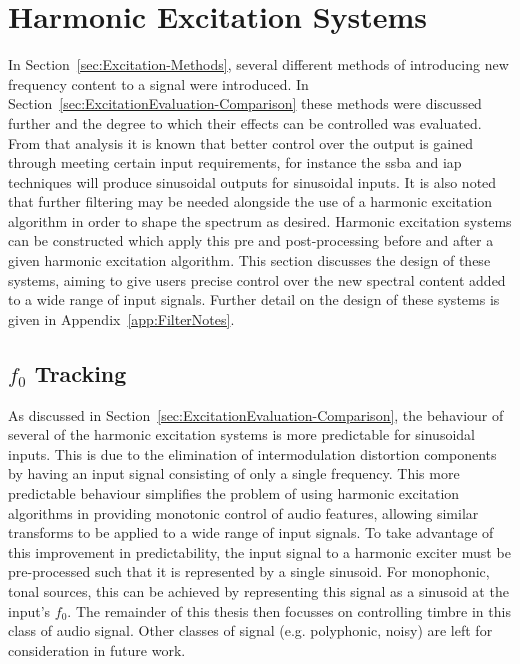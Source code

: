 \section{Harmonic Excitation Systems}
\label{sec:FeatureControl-Systems}
	In Section~\ref{sec:Excitation-Methods}, several different methods of introducing new frequency content to a signal
	were introduced. In Section~\ref{sec:ExcitationEvaluation-Comparison} these methods were discussed further and the
	degree to which their effects can be controlled was evaluated. From that analysis it is known that better control
	over the output is gained through meeting certain input requirements, for instance the \acrshort{ssba} and
	\acrshort{iap} techniques will produce sinusoidal outputs for sinusoidal inputs. It is also noted that further
	filtering may be needed alongside the use of a harmonic excitation algorithm in order to shape the spectrum as
	desired. Harmonic excitation systems can be constructed which apply this pre and post-processing before and after a
	given harmonic excitation algorithm. This section discusses the design of these systems, aiming to give users
	precise control over the new spectral content added to a wide range of input signals. Further detail on the design
	of these systems is given in Appendix~\ref{app:FilterNotes}.

	\subsection{$f_{0}$ Tracking}
	\label{sec:FeatureControl-Systems-Fundamental}
		As discussed in Section~\ref{sec:ExcitationEvaluation-Comparison}, the behaviour of several of the harmonic
		excitation systems is more predictable for sinusoidal inputs. This is due to the elimination of
		intermodulation distortion components by having an input signal consisting of only a single frequency. This
		more predictable behaviour simplifies the problem of using harmonic excitation algorithms in providing
		monotonic control of audio features, allowing similar transforms to be applied to a wide range of input
		signals. To take advantage of this improvement in predictability, the input signal to a harmonic exciter
		must be pre-processed such that it is represented by a single sinusoid. For monophonic, tonal sources, this
		can be achieved by representing this signal as a sinusoid at the input's $f_{0}$. The remainder of this
		thesis then focusses on controlling timbre in this class of audio signal. Other classes of signal
		(e.g. polyphonic, noisy) are left for consideration in future work.
		
